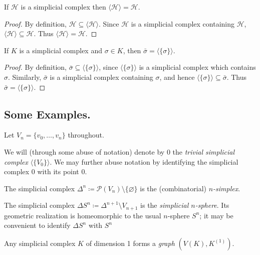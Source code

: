 \begin{proposition}
    If $\mathcal{H}$ is a simplicial complex then $\langle \mathcal{H} \rangle = \mathcal{H}$.
\end{proposition}
\begin{proof}
    By definition, $\mathcal{H} \subseteq \langle \mathcal{H} \rangle$. Since $\mathcal{H}$ is a simplicial complex containing $\mathcal{H}$,
    $\langle \mathcal{H} \rangle \subseteq \mathcal{H}$. Thus $\langle \mathcal{H} \rangle = \mathcal{H}$.
\end{proof}

\begin{proposition}
    If $K$ is a simplicial complex and $\sigma \in K$, then $\bar{\sigma} = \langle \{\sigma\} \rangle$.
\end{proposition}
\begin{proof}
    By definition, $\bar{\sigma} \subseteq \langle \{\sigma\} \rangle$, since $\langle \{\sigma\} \rangle$ is a simplicial complex which
    contains $\sigma$. Similarly, $\bar{\sigma}$ is a simplicial complex containing $\sigma$, and hence $\langle \{\sigma\} \rangle
    \subseteq \bar{\sigma}$. Thus $\bar{\sigma} = \langle \{\sigma\} \rangle$.
\end{proof}

\subsection*{Some Examples.}

Let $V_n = \{v_0, \dots, v_n\}$ throughout.

\begin{example}
    We will (through some abuse of notation) denote by $0$ the \emph{trivial simplicial complex} $\langle \{V_0\} \rangle$.
    We may further abuse notation by identifying the simplicial complex $0$ with its point $0$.
\end{example}

\begin{example}
    The simplicial complex $\Delta^n \coloneqq \mathcal{P}(V_n) \setminus \{\varnothing\}$ is the (combinatorial)
    \emph{$n$-simplex}.

    The simplicial complex $\Delta S^n \coloneqq \Delta^{n+1} \setminus V_{n+1}$ is the \emph{simplicial $n$-sphere}. Its geometric
    realization is homeomorphic to the usual $n$-sphere $S^n$; it may be convenient to identify $\Delta S^n$ with $S^n$
\end{example}
    
\begin{example}
    Any simplicial complex $K$ of dimension 1 forms a \emph{graph} $(V(K), K^{(1)})$.
\end{example}

